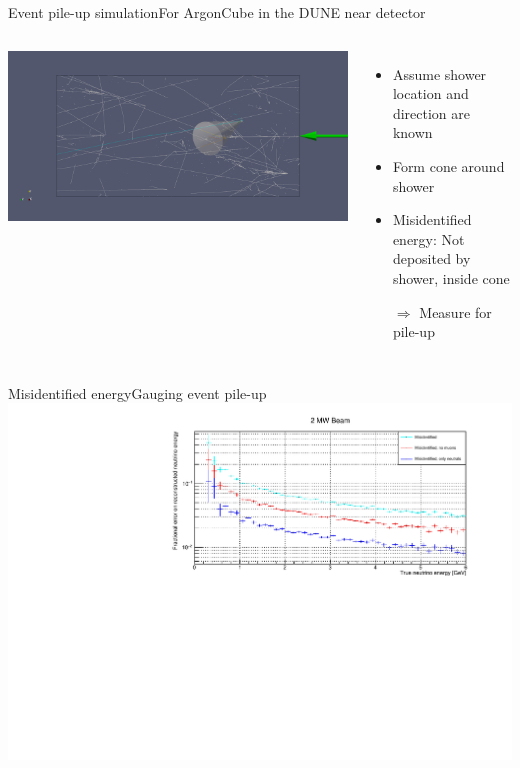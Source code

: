 \documentclass[]{beamer}
\newcommand*{\AC}{{ArgonCube}}
\newcommand*{\dune}{{DUNE}}
\begin{document}
\begin{frame}{Event pile-up simulation}{For \AC{} in the \dune{} near detector}
	\begin{columns}[c]
		\centering
		\includegraphics[viewport=4800 1700 6300 2700, clip, width=\textwidth]{defence/uid0_spill6_event461_gamma19_x}
		\begin{itemize}
			\item Assume shower location and direction are known
			\item Form cone around shower
			\item Misidentified energy: Not deposited by shower, inside cone
			\item[$\Rightarrow$] Measure for pile-up
		\end{itemize}
	\end{columns}
\end{frame}

\begin{frame}{Misidentified energy}{Gauging event pile-up}
	\centering
	\includegraphics[width=\textwidth]{pile-up/2MW/misid_rel_x}
\end{frame}
\end{document}
